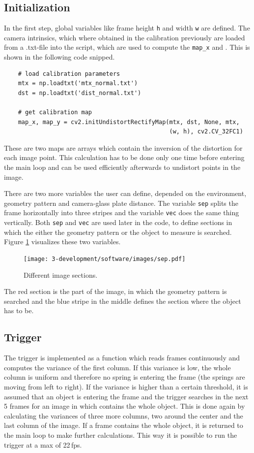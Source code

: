 \subsection{Initialization}
In the first step, global variables like frame height \texttt{h} and width \texttt{w} are defined.
The camera intrinsics, which where obtained in the calibration previously are loaded from a .txt-file into the script, which are used to compute the \texttt{map\_x} and .
This is shown in the following code snipped.
\begin{lstlisting}
	# load calibration parameters
	mtx = np.loadtxt('mtx_normal.txt')
	dst = np.loadtxt('dist_normal.txt')

	# get calibration map
	map_x, map_y = cv2.initUndistortRectifyMap(mtx, dst, None, mtx,
	                                           (w, h), cv2.CV_32FC1)
\end{lstlisting}
These are two maps are arrays which contain the inversion of the distortion for each image point.
This calculation has to be done only one time before entering the main loop and can be used efficiently afterwards to undistort points in the image.

There are two more variables the user can define, depended on the environment, geometry pattern and camera-glass plate distance.
The variable \texttt{sep} splits the frame horizontally into three stripes and the variable \texttt{vec} does the same thing vertically.
Both \texttt{sep} and \texttt{vec} are used later in the code, to define sections in which the either the geometry pattern or the object to measure is searched.
Figure \ref{development:sep} visualizes these two variables.
\begin{figure}[ht]
	\centering
	\texttt{[image: 3-development/software/images/sep.pdf]}
	\caption{Different image sections.\label{development:sep}}
\end{figure}
The red section is the part of the image, in which the geometry pattern is searched and the blue stripe in the middle defines the section where the object has to be.

\subsection{Trigger}
The trigger is implemented as a function which reads frames continuously and computes the variance of the first column.
If this variance is low, the whole column is uniform and therefore no spring is entering the frame (the springs are moving from left to right).
If the variance is higher than a certain threshold, it is assumed that an object is entering the frame and the trigger searches in the next 5 frames for an image in which contains the whole object.
This is done again by calculating the variances of three more columns, two around the center and the last column of the image.
If a frame contains the whole object, it is returned to the main loop to make further calculations.
This way it is possible to run the trigger at a max of 22\,fps.

